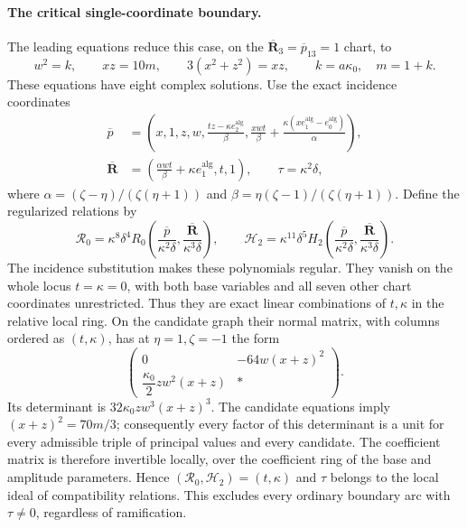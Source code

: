 \documentclass[11pt,a4paper]{article}
\numberwithin{equation}{section}
\theoremstyle{plain}
\theoremstyle{definition}
\theoremstyle{remark}
\begin{document}
\paragraph{The critical single-coordinate boundary.}
The leading equations reduce this case, on the
$\overline{\boldsymbol R}_3=\overline p_{13}=1$ chart, to
\[
 w^2=k,\qquad xz=10m,\qquad 3(x^2+z^2)=xz,
 \qquad k=a\kappa_0 ,\quad m=1+k.
\]
These equations have eight complex solutions.
Use the exact incidence coordinates
\[
\begin{aligned}
 \overline p
 &=\left(x,1,z,w,\frac{tz-\kappa e_2^{\mathrm{alg}}}{\beta},
       \frac{xwt}{\beta}+\frac{\kappa(xe_1^{\mathrm{alg}}-e_0^{\mathrm{alg}})}{\alpha}\right),\\
 \overline{\boldsymbol R}&=\left(\frac{\alpha wt}{\beta}+\kappa e_1^{\mathrm{alg}},t,1\right),
 \qquad \tau=\kappa^2\delta,
\end{aligned}
\]
where $\alpha=(\zeta -\eta )/(\zeta (\eta +1))$ and
$\beta=\eta (\zeta -1)/(\zeta (\eta +1))$.
Define the regularized relations by
\[
 \mathcal R_0=\kappa^8\delta^4
     R_0\left(\frac{\overline p}{\kappa^2\delta},
              \frac{\overline{\boldsymbol R}}{\kappa^3\delta}\right),\qquad
 \mathcal H_2=\kappa^{11}\delta^5
     H_2\left(\frac{\overline p}{\kappa^2\delta},
              \frac{\overline{\boldsymbol R}}{\kappa^3\delta}\right).
\]
The incidence substitution makes these polynomials regular. They
vanish on the whole locus $t=\kappa=0$, with both base variables
and all seven other chart coordinates unrestricted. Thus they
are exact linear combinations of $t,\kappa$ in the relative
local ring. On the candidate graph their normal matrix,
with columns ordered as $(t,\kappa)$, has at $\eta =1,\zeta =-1$ the form
\[
 \begin{pmatrix}
 0&-64w(x+z)^2\\[2pt]
 \dfrac{\kappa_0}{2}zw^2(x+z)&*
 \end{pmatrix}.
\]
Its determinant is $32\kappa_0 zw^3(x+z)^3$.
The candidate equations imply $(x+z)^2=70m/3$; consequently
every factor of this determinant is a unit for every admissible
triple of principal values and every candidate. The coefficient matrix
is therefore invertible locally, over the coefficient ring of the base and amplitude parameters. Hence
$(\mathcal R_0,\mathcal H_2)=(t,\kappa)$ and $\tau$ belongs to
the local ideal of compatibility relations. This excludes every ordinary boundary
arc with $\tau\ne0$, regardless of ramification.
\end{document}
